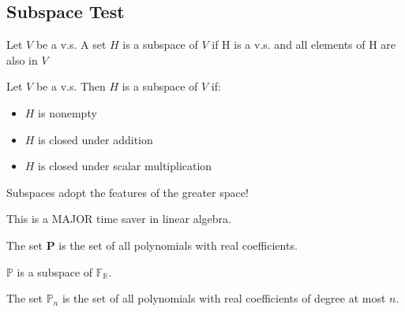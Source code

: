 \documentclass{report}
\begin{document}
\subsection*{Subspace Test}
\begin{definition}
	Let $V$ be a v.s. A set $H$ is a subspace of $V$ if H is a v.s. and all elements of H are also in $V$
\end{definition}
\begin{theorem}
	Let $V$ be a v.s. Then $H$ is a subspace of $V$ if:
	\begin{itemize}
		\item $H$ is nonempty
		\item $H$ is closed under addition
		\item $H$ is closed under scalar multiplication
	\end{itemize}
\end{theorem}
Subspaces adopt the features of the greater space!
\begin{remark}
	This is a MAJOR time saver in linear algebra.
\end{remark}
\begin{definition}
	The set $\mathbf{P}$ is the set of all polynomials with real coefficients.
\end{definition}
\begin{theorem}
	$\mathbb{P}$ is a subspace of $\mathbb{F}_{\mathbb{R}}$.
\end{theorem}
\begin{definition}
	The set $\mathbb{P}_n$ is the set of all polynomials with real coefficients of degree at most $n$.
\end{definition}
\end{document}
